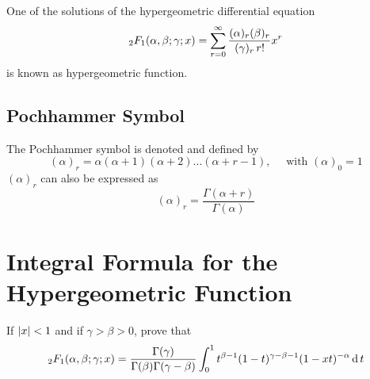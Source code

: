 \documentclass[../main-sheet.tex]{subfiles}
\begin{document}
One of the solutions of the hypergeometric differential equation 
\[
    {}_2F_1(\alpha,\beta;\gamma;x)=\sum_{r=0}^\infty \frac{(\alpha)_r (\beta)_r}{(\gamma)_r\,r!}x^r
\]
is known as hypergeometric function.
\subsection{Pochhammer Symbol}
The Pochhammer symbol is denoted and defined by
\[
    (\alpha)_r=\alpha(\alpha+1)(\alpha+2)\dots(\alpha+r-1),\quad\text{ with }(\alpha)_0=1
\]
\( (\alpha)_r \) can also be expressed as 
\[
    (\alpha)_r=\frac{\Gamma(\alpha+r)}{\Gamma(\alpha)}
\]
\section{Integral Formula for the Hypergeometric Function}
\begin{prob}
    If \( \left\vert x\right\vert<1 \) and if \( \gamma>\beta>0 \), prove that 
    \[
        {}_2F_1(\alpha,\beta;\gamma;x)=\frac{\Gamma(\gamma)}{\Gamma(\beta)\Gamma(\gamma-\beta)}\int_0^1t^{\beta-1}(1-t)^{\gamma-\beta-1}(1-xt)^{-\alpha}\,\mathrm{d}\, t
    \]
\end{prob}
\end{document}
